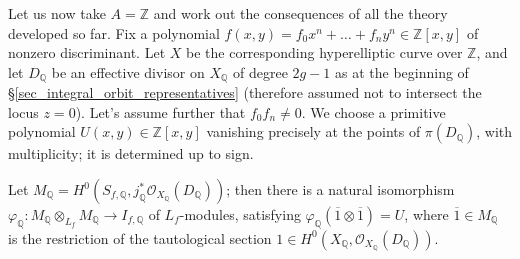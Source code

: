 \documentclass{article} %
\numberwithin{equation}{section}
\newcommand{\cO}{\mathcal{O}}
\begin{document}
Let us now take $A = \mathbb{Z}$ and work out the consequences of all the theory developed so far. Fix a polynomial $f(x, y) = f_0 x^n + \dots + f_n y^n \in \mathbb{Z}[x, y]$ of nonzero discriminant. Let $X$ be the corresponding hyperelliptic curve over $\mathbb{Z}$, and let $D_\mathbb{Q}$ be an effective divisor on $X_\mathbb{Q}$ of degree $2g-1$ as at the beginning of \S \ref{sec_integral_orbit_representatives} (therefore assumed not to intersect the locus $z = 0$). Let's assume further that $f_0 f_n \neq 0$. We choose a primitive polynomial $U(x, y) \in \mathbb{Z}[x, y]$ vanishing precisely at the points of $\pi(D_\mathbb{Q})$, with multiplicity; it is determined up to sign. 

Let $M_\mathbb{Q} = H^0(S_{f, \mathbb{Q}}, j_\mathbb{Q}^\ast \cO_{X_\mathbb{Q}}(D_\mathbb{Q}))$; then there is a natural isomorphism $\varphi_\mathbb{Q} : M_\mathbb{Q} \otimes_{L_f} M_\mathbb{Q} \to I_{f, \mathbb{Q}}$ of $L_f$-modules, satisfying $\varphi_\mathbb{Q}(\overline{1} \otimes \overline{1}) = U$, where $\overline{1} \in M_\mathbb{Q}$ is the restriction of the tautological section $1 \in H^0(X_\mathbb{Q}, \cO_{X_\mathbb{Q}}(D_\mathbb{Q}))$.
\end{document}
